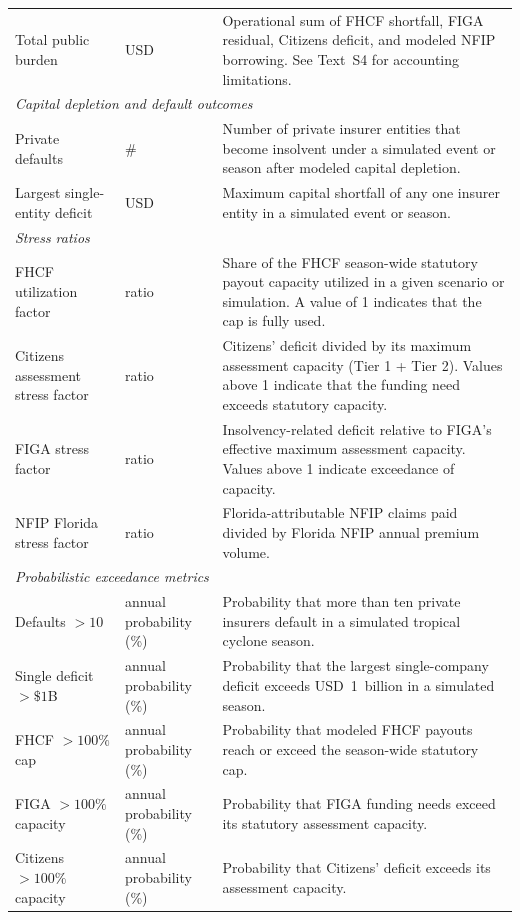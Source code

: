 \documentclass[fleqn,10pt]{wlscirep}
\begin{document}
\begin{landscape}
\begin{table}[]
{\begin{tabular}{@{}lll@{}}
Total public burden &
  USD &
  Operational sum of FHCF shortfall, FIGA residual, Citizens deficit, and modeled NFIP borrowing. See Text~S4 for accounting limitations. \\
\multicolumn{3}{l}{\textit{Capital depletion and default outcomes}} \\
Private defaults &
  \# &
  Number of private insurer entities that become insolvent under a simulated event or season after modeled capital depletion. \\
Largest single-entity deficit &
  USD &
  Maximum capital shortfall of any one insurer entity in a simulated event or season. \\
\multicolumn{3}{l}{\textit{Stress ratios}} \\
FHCF utilization factor &
  ratio &
  Share of the FHCF season-wide statutory payout capacity utilized in a given scenario or simulation. A value of 1 indicates that the cap is fully used. \\
Citizens assessment stress factor &
  ratio &
  Citizens' deficit divided by its maximum assessment capacity (Tier 1 + Tier 2). Values above 1 indicate that the funding need exceeds statutory capacity. \\
FIGA stress factor &
  ratio &
  Insolvency-related deficit relative to FIGA's effective maximum assessment capacity. Values above 1 indicate exceedance of capacity. \\
NFIP Florida stress factor &
  ratio &
  Florida-attributable NFIP claims paid divided by Florida NFIP annual premium volume. \\
\multicolumn{3}{l}{\textit{Probabilistic exceedance metrics}} \\
Defaults $> 10$ &
  annual probability (\%) &
  Probability that more than ten private insurers default in a simulated tropical cyclone season. \\
Single deficit $> \$1$B &
  annual probability (\%) &
  Probability that the largest single-company deficit exceeds USD~1~billion in a simulated season. \\
FHCF $> 100\%$ cap &
  annual probability (\%) &
  Probability that modeled FHCF payouts reach or exceed the season-wide statutory cap. \\
FIGA $> 100\%$ capacity &
  annual probability (\%) &
  Probability that FIGA funding needs exceed its statutory assessment capacity. \\
Citizens $> 100\%$ capacity &
  annual probability (\%) &
  Probability that Citizens' deficit exceeds its assessment capacity. \\

\end{tabular}}
\end{table}
\end{landscape}
\end{document}
